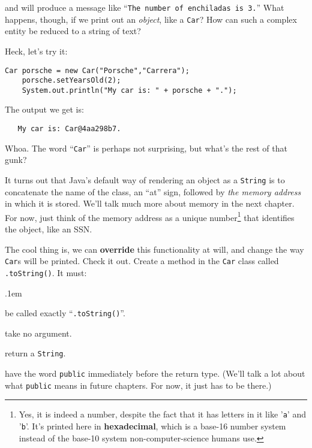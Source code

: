 and will produce a message like ``\texttt{The number of enchiladas is 3.}''
What happens, though, if we print out an \textit{object}, like a \texttt{Car}?
How can such a complex entity be reduced to a string of text?

Heck, let's try it:

\begin{Verbatim}[samepage=true,fontsize=\scriptsize,frame=single]
    Car porsche = new Car("Porsche","Carrera");
    porsche.setYearsOld(2);
    System.out.println("My car is: " + porsche + ".");
\end{Verbatim}

The output we get is:

\begin{verbatim}
   My car is: Car@4aa298b7.
\end{verbatim}

Whoa. The word ``\texttt{Car}'' is perhaps not surprising, but what's the rest
of that gunk?

It turns out that Java's default way of rendering an object as a
\texttt{String} is to concatenate the name of the class, an ``at'' sign,
followed by \textit{the memory address} in which it is stored. We'll talk much
more about memory in the next chapter. For now, just think of the memory
address as a unique number\footnote{Yes, it is indeed a number, despite the
fact that it has letters in it like '\texttt{a}' and '\texttt{b}'. It's
printed here in \textbf{hexadecimal}, which is a base-16 number system instead
of the base-10 system non-computer-science humans use.} that identifies the
object, like an SSN.

\begin{samepage}
\label{pg:toString}
The cool thing is, we can \textbf{override} this functionality at will, and
change the way \texttt{Car}s will be printed. Check it out. Create a method in
the \texttt{Car} class called \texttt{.toString()}. It must:

\begin{compactenum}
\itemsep.1em
\item be called exactly ``\texttt{.toString()}''.
\item take no argument.
\item return a \texttt{String}.
\item have the word \texttt{public} immediately before the return type. (We'll
talk a lot about what \texttt{public} means in future chapters. For now, it just has to
be there.)
\end{compactenum}
\end{samepage}

